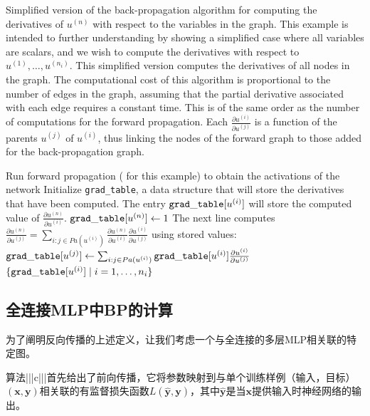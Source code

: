 \begin{algorithm}[ht]
  \caption{Simplified version of the back-propagation algorithm for computing
  the derivatives of $u^{(n)}$ with respect to the variables in the graph.
  This example is intended to further understanding by showing a simplified
  case where all variables are scalars, and we wish to compute the derivatives
  with respect to $u^{(1)}, \dots, u^{(n_i)}$.
  This simplified version computes the derivatives of all nodes in the graph.
The computational cost of this algorithm
is proportional to the number of edges in the graph, assuming that the
partial derivative associated with each edge requires a constant time. This
is of the same order as the number of computations for the forward propagation.
Each $\frac{\partial u^{(i)}}{\partial u^{(j)}}$ is a function of the parents $u^{(j)}$
of $u^{(i)}$, thus linking the nodes of the forward graph to those added for
the back-propagation graph.
}
\label{alg:bprop}
\begin{algorithmic}
\STATE Run forward propagation ( for this example) to obtain
the activations of the network
\STATE Initialize {\tt grad\_table}, a data structure that will store the derivatives
that have been computed. The entry ${\tt grad\_table}[u^{(i)}]$ will store the computed
value of $\frac{\partial u^{(n)}}{\partial u^{(i)}}$.
\STATE ${\tt grad\_table}[u^{(n)}] \leftarrow 1$
\STATE The next line computes $\frac{\partial u^{(n)}}{\partial u^{(j)}} =
  \sum_{i: j \in Pa(u^{(i)})} \frac{\partial u^{(n)}}{\partial u^{(i)}} \frac{\partial u^{(i)}}{\partial u^{(j)}}$ using stored values:
\STATE ${\tt grad\_table}[ u^{(j)}] \leftarrow 
\sum_{i: j \in Pa(u^{(i)})} {\tt grad\_table}[u^{(i)}]
\frac{\partial u^{(i)}}{\partial u^{(j)}}$
\ENDFOR
{} $\{ {\tt grad\_table}[ u^{(i)}] \mid i=1, \dots, n_i \} $
\end{algorithmic}
\end{algorithm}



\subsection{全连接MLP中BP的计算}
\label{sec:back_propagation_computation_in_fully_connected_mlp}

为了阐明反向传播的上述定义，让我们考虑一个与全连接的多层MLP相关联的特定图。

算法|||c|||首先给出了前向传播，它将参数映射到与单个训练样例（输入，目标）$(\bm{x},\bm{y})$相关联的有监督损失函数$L(\hat{\bm{y}}, \bm{y})$，其中$\hat{\bm{y}}$是当$\bm{x}$提供输入时神经网络的输出。

